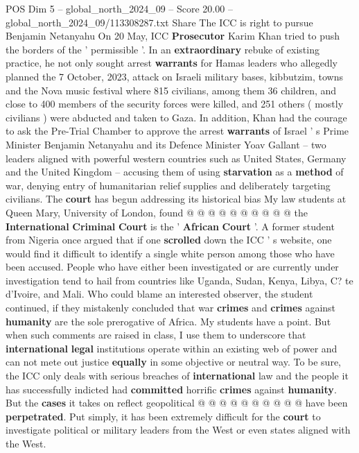 \begin{textsample}{POS Dim 5 – global\_north\_2024\_09 – Score 20.00 – global\_north\_2024\_09/113308287.txt}  \label{ex:f5_pos_351}
Share The ICC is right to pursue Benjamin Netanyahu On 20 May, ICC \textbf{Prosecutor} Karim Khan tried to push the borders of the ' permissible '.
In an \textbf{extraordinary} rebuke of existing practice, he not only sought arrest \textbf{warrants} for Hamas leaders who allegedly planned the 7 October, 2023, attack on Israeli military bases, kibbutzim, towns and the Nova music festival where 815 civilians, among them 36 children, and close to 400 members of the security forces were killed, and 251 others ( mostly civilians ) were abducted and taken to Gaza.
In addition, Khan had the courage to ask the Pre-Trial Chamber to approve the arrest \textbf{warrants} of Israel ' s Prime Minister Benjamin Netanyahu and its Defence Minister Yoav Gallant -- two leaders aligned with powerful western countries such as United States, Germany and the United Kingdom -- accusing them of using \textbf{starvation} as a \textbf{method} of war, denying entry of humanitarian relief supplies and deliberately targeting civilians.
The \textbf{court} has begun addressing its historical bias My law students at Queen Mary, University of London, found @ @ @ @ @ @ @ @ @ @ the \textbf{International} \textbf{Criminal} \textbf{Court} is the ' \textbf{African} \textbf{Court} '.
A former student from Nigeria once argued that if one \textbf{scrolled} down the ICC ' s website, one would find it difficult to identify a single white person among those who have been accused.
People who have either been investigated or are currently under investigation tend to hail from countries like Uganda, Sudan, Kenya, Libya, C? te d'Ivoire, and Mali.
Who could blame an interested observer, the student continued, if they mistakenly concluded that war \textbf{crimes} and \textbf{crimes} against \textbf{humanity} are the sole prerogative of Africa.
My students have a point.
But when such comments are raised in class, I use them to underscore that \textbf{international} \textbf{legal} institutions operate within an existing web of power and can not mete out justice \textbf{equally} in some objective or neutral way.
To be sure, the ICC only deals with serious breaches of \textbf{international} law and the people it has successfully indicted had \textbf{committed} horrific \textbf{crimes} against \textbf{humanity}.
But the \textbf{cases} it takes on reflect geopolitical @ @ @ @ @ @ @ @ @ @ have been \textbf{perpetrated}.
Put simply, it has been extremely difficult for the \textbf{court} to investigate political or military leaders from the West or even states aligned with the West.

\end{textsample}
